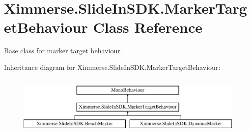 \hypertarget{class_ximmerse_1_1_slide_in_s_d_k_1_1_marker_target_behaviour}{}\section{Ximmerse.\+Slide\+In\+S\+D\+K.\+Marker\+Target\+Behaviour Class Reference}
\label{class_ximmerse_1_1_slide_in_s_d_k_1_1_marker_target_behaviour}


Base class for marker target behaviour.  


Inheritance diagram for Ximmerse.\+Slide\+In\+S\+D\+K.\+Marker\+Target\+Behaviour\+:\begin{figure}[H]
\begin{center}
\leavevmode
\includegraphics[height=2.989324cm]{class_ximmerse_1_1_slide_in_s_d_k_1_1_marker_target_behaviour}
\end{center}
\end{figure}
